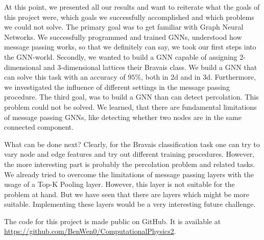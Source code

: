 At this point, we presented all our results and want to reiterate what the 
goals of this project were, which goals we successfully accomplished and which 
problems we could not solve.
The primary goal was to get familiar with Graph Neural Networks. 
We successfully programmed and trained GNNs, understood how message passing works, so that we definitely can say, we took our 
first steps into the GNN-world. Secondly, we wanted to build a GNN capable of assigning 2-dimensional and
3-dimensional lattices their Bravais class. We build a GNN that can solve this task with an accuracy of $95\%$, both in 2d and in 3d.
Furthermore, we investigated the influence of different settings in the message passing procedure. 
The third goal, was to build a GNN than can detect percolation. This problem could not be solved.
We learned, that there are fundamental limitations of message passing GNNs, like detecting whether two nodes are in the same connected component.

What can be done next? 
Clearly, for the Bravais classification task one can try to vary node and edge features and try out different training procedures.
However, the more interesting part is probably the percolation problem and related tasks. We already tried to overcome the
limitations of message passing layers with the usage of a Top-K Pooling layer. However, this layer is not suitable
for the problem at hand. But we have seen that there are layers which might be more suitable. 
Implementing these layers would be a very interesting future challenge.

The code for this project is made public on GitHub. 
It is available at \url{https://github.com/BenWen0/ComputationalPhysics2}.
